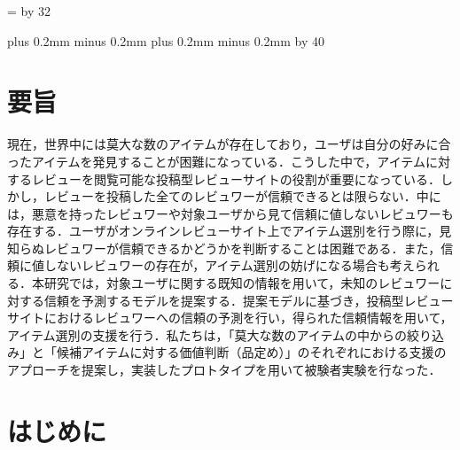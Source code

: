 \documentclass[a4paper,11pt,oneside,openany]{jsbook}
\def\linesparpage#1{\baselineskip=\textheight
   \divide\baselineskip by #1}
\def\kcharparline#1{
   \ifx\xkanjiskip\undefined
   \jintercharskip 0mm plus 0.2mm minus 0.2mm
   \else
   \xkanjiskip 0mm plus 0.2mm minus 0.2mm
   \fi
   \settowidth{\textwidth}{}
   \multiply\textwidth by #1
   }
\begin{document}
\linesparpage{32} 
\kcharparline{40}



\frontmatter

\chapter{要旨}
現在，世界中には莫大な数のアイテムが存在しており，ユーザは自分の好みに合ったアイテムを発見することが困難になっている．こうした中で，アイテムに対するレビューを閲覧可能な投稿型レビューサイトの役割が重要になっている．しかし，レビューを投稿した全てのレビュワーが信頼できるとは限らない．中には，悪意を持ったレビュワーや対象ユーザから見て信頼に値しないレビュワーも存在する．ユーザがオンラインレビューサイト上でアイテム選別を行う際に，見知らぬレビュワーが信頼できるかどうかを判断することは困難である．また，信頼に値しないレビュワーの存在が，アイテム選別の妨げになる場合も考えられる．本研究では，対象ユーザに関する既知の情報を用いて，未知のレビュワーに対する信頼を予測するモデルを提案する．提案モデルに基づき，投稿型レビューサイトにおけるレビュワーへの信頼の予測を行い，得られた信頼情報を用いて，アイテム選別の支援を行う．私たちは，「莫大な数のアイテムの中からの絞り込み」と「候補アイテムに対する価値判断（品定め）」のそれぞれにおける支援のアプローチを提案し，実装したプロトタイプを用いて被験者実験を行なった．
\par


\tableofcontents

\mainmatter

\chapter{はじめに}
\end{document}
